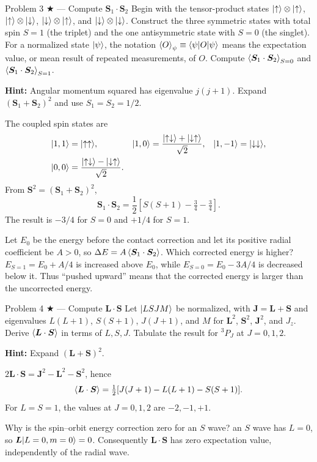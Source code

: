 \documentclass[11pt]{article}
\begin{document}
\begin{problem}{Problem 3 ★ — Compute $\bm S_1\cdot\bm S_2$}
Begin with the tensor-product states
$\lvert \uparrow\rangle\otimes\lvert \uparrow\rangle$, $\lvert \uparrow\rangle\otimes\lvert \downarrow\rangle$,
$\lvert \downarrow\rangle\otimes\lvert \uparrow\rangle$, and
$\lvert \downarrow\rangle\otimes\lvert \downarrow\rangle$. Construct the three symmetric states
with total spin $S=1$ (the triplet) and the one antisymmetric state with $S=0$
(the singlet). For a normalized state $\lvert \psi\rangle$, the notation
$\left\langle O\right\rangle_\psi\equiv\langle \psi\rvert O\lvert \psi\rangle$ means the expectation value, or mean
result of repeated measurements, of $O$. Compute
$\left\langle \bm S_1\cdot\bm S_2\right\rangle_{S=0}$ and
$\left\langle \bm S_1\cdot\bm S_2\right\rangle_{S=1}$.

\textbf{Hint:} Angular momentum squared has eigenvalue $j(j+1)$.
Expand $(\bm S_1+\bm S_2)^2$ and use $S_1=S_2=1/2$.
\end{problem}
\begin{solution}
The coupled spin states are
\[
\begin{aligned}
\lvert 1,1\rangle&=\lvert \uparrow\uparrow\rangle,&
\lvert 1,0\rangle&=\frac{\lvert \uparrow\downarrow\rangle+\lvert \downarrow\uparrow\rangle}{\sqrt2},&
\lvert 1,-1\rangle&=\lvert \downarrow\downarrow\rangle,\\
\lvert 0,0\rangle&=\frac{\lvert \uparrow\downarrow\rangle-\lvert \downarrow\uparrow\rangle}{\sqrt2}.
\end{aligned}
\]
From $\bm S^2=(\bm S_1+\bm S_2)^2$,
\[
\bm S_1\cdot\bm S_2=\frac12[S(S+1)-\tfrac34-\tfrac34].
\]
The result is $-3/4$ for $S=0$ and $+1/4$ for $S=1$.
\end{solution}
\begin{quiz}
Let $E_0$ be the energy before the contact correction and let its positive
radial coefficient be $A>0$, so
$\Delta E=A\left\langle \bm S_1\cdot\bm S_2\right\rangle$. Which corrected energy is higher?
\answer $E_{S=1}=E_0+A/4$ is increased above $E_0$, while
$E_{S=0}=E_0-3A/4$ is decreased below it. Thus ``pushed upward'' means that the
corrected energy is larger than the uncorrected energy.
\end{quiz}

\begin{problem}{Problem 4 ★ — Compute $\bm L\cdot\bm S$}
Let $\lvert LSJM\rangle$ be normalized, with $\bm J=\bm L+\bm S$ and eigenvalues
$L(L+1)$, $S(S+1)$, $J(J+1)$, and $M$ for
$\bm L^2$, $\bm S^2$, $\bm J^2$, and $J_z$.
Derive $\left\langle \bm L\cdot\bm S\right\rangle$ in terms of $L,S,J$.
Tabulate the result for $^3P_J$ at $J=0,1,2$.

\textbf{Hint:} Expand $(\bm L+\bm S)^2$.
\end{problem}
\begin{solution}
$2\bm L\cdot\bm S=\bm J^2-\bm L^2-\bm S^2$, hence
\[
\left\langle \bm L\cdot\bm S\right\rangle=\tfrac12[J(J+1)-L(L+1)-S(S+1)].
\]
For $L=S=1$, the values at $J=0,1,2$ are $-2,-1,+1$.
\end{solution}
\begin{quiz}
Why is the spin--orbit energy correction zero for an $S$ wave? \answer an
$S$ wave has $L=0$, so $\bm L\lvert L=0,m=0\rangle=0$. Consequently
$\bm L\cdot\bm S$ has zero expectation value, independently of the radial wave.
\end{quiz}
\end{document}
